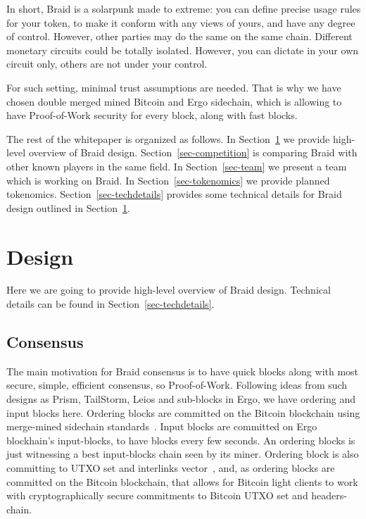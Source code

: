 \documentclass{llncs}   %
\newcommand{\bc}{Braid}
\begin{document}
In short, \bc{} is a solarpunk made to extreme: you can define precise usage rules for your token, to make it conform with any views of yours, and have any degree of control. However, other parties may do the same on the same chain. Different monetary circuits could be totally isolated. However, you can dictate in your own circuit only, others are not under your control.

For such setting, minimal trust assumptions are needed. That is why we have chosen double merged mined Bitcoin and Ergo sidechain, which is allowing to have Proof-of-Work security for every block, along with fast blocks. 

The rest of the whitepaper is organized as follows. In Section~\ref{sec-design} we provide high-level overview of \bc{} design. Section~\ref{sec-competition} is
 comparing \bc{} with other known players in the same field. In Section~\ref{sec-team} we present a team which is working on \bc{}. In Section~\ref{sec-tokenomics}
we provide planned tokenomics. Section~\ref{sec-techdetails} provides some technical details for \bc{} design outlined in Section~\ref{sec-design}.

\section{Design}
\label{sec-design}

Here we are going to provide high-level overview of \bc{} design. Technical details can be found in Section~\ref{sec-techdetails}.


\subsection{Consensus}

The main motivation for \bc{} consensus is to have quick blocks along with most secure, simple, efficient consensus, so Proof-of-Work. Following ideas from such designs as Prism, TailStorm, Leios and sub-blocks in Ergo, we have ordering and input blocks here. Ordering blocks are committed on the Bitcoin blockchain using merge-mined sidechain standards~\cite{bitcoinmm}.
Input blocks are committed on Ergo blockhain's input-blocks, to have blocks every few seconds. An ordering blocks is just witnessing a best input-blocks chain seen by
its miner. Ordering block is also committing to UTXO set and interlinks vector~\cite{kiayias2020non}, and, as ordering blocks are committed on the Bitcoin blockchain, that
allows for Bitcoin light clients to work with cryptographically secure commitments to Bitcoin UTXO set and headers-chain.
\end{document}
